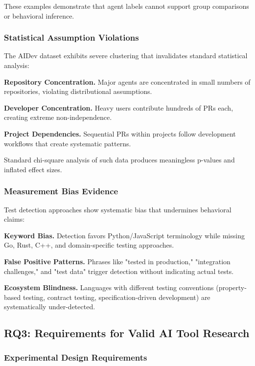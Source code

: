\documentclass[conference]{IEEEtran}
\begin{document}
These examples demonstrate that agent labels cannot support group comparisons or behavioral inference.

\subsubsection{Statistical Assumption Violations}

The AIDev dataset exhibits severe clustering that invalidates standard statistical analysis:

\textbf{Repository Concentration.} Major agents are concentrated in small numbers of repositories, violating distributional assumptions.

\textbf{Developer Concentration.} Heavy users contribute hundreds of PRs each, creating extreme non-independence.

\textbf{Project Dependencies.} Sequential PRs within projects follow development workflows that create systematic patterns.

Standard chi-square analysis of such data produces meaningless p-values and inflated effect sizes.

\subsubsection{Measurement Bias Evidence}

Test detection approaches show systematic bias that undermines behavioral claims:

\textbf{Keyword Bias.} Detection favors Python/JavaScript terminology while missing Go, Rust, C++, and domain-specific testing approaches.

\textbf{False Positive Patterns.} Phrases like "tested in production," "integration challenges," and "test data" trigger detection without indicating actual tests.

\textbf{Ecosystem Blindness.} Languages with different testing conventions (property-based testing, contract testing, specification-driven development) are systematically under-detected.

\subsection{RQ3: Requirements for Valid AI Tool Research}

\subsubsection{Experimental Design Requirements}
\end{document}
